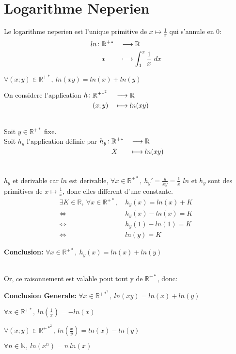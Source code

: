 \documentclass[12pt,twoside,a4paper]{article}
\author{MPSI 2}
\begin{document}
	\maketitle
\section{Logarithme Neperien}
	\begin{defi}
		Le logarithme neperien est l'unique primitive de $x\longmapsto\frac{1}{x}$ qui s'annule en 0:
		$$
			\fonction{ln}{\mathbb{R}^{+*}}{\mathbb{R}}{x}{\int_1^x\frac{1}{x}\ dx}
		$$
	\end{defi}
	\begin{prop}
		$\forall(x;y)\in\mathbb{R}^{+*},\ ln(xy)=ln(x)+ln(y)$
	\end{prop}
	\begin{preuve}
		On considere l'application $\begin{aligned}[t]h\colon&\mathbb{R}^{+*^2}&&\longrightarrow\mathbb{R} \\&(x;y)&&\longmapsto ln(xy)\end{aligned}$\\\\
		\begin{tab}
			Soit $y\in\mathbb{R}^{+*}$ fixe. \\
			Soit $h_y$ l'application définie par $\begin{aligned}[t]h_y\colon&\mathbb{R}^{+*}&&\longrightarrow\mathbb{R} \\&X&&\longmapsto ln(xy)\end{aligned}$\\\\\\
			$h_y$ et derivable car $ln$ est derivable, $\forall x\in\mathbb{R}^{+*},\ h_y'=\frac{y}{xy}=\frac{1}{x}$
			$ln$ et $h_y$ sont des primitives de $x\longmapsto\frac{1}{x}$, donc elles different d'une constante.
			$$\begin{aligned}
				\exists K\in\mathbb{R},\ \forall x\in\mathbb{R}^{+*},\ &h_y(x)=ln(x)+K\\
				\iff &h_y(x)-ln(x)=K\\
				\iff &h_y(1)-ln(1)=K\\
				\iff &ln(y)=K
			\end{aligned}$$
		\end{tab}
		\textbf{Conclusion:} $\forall x\in\mathbb{R}^{+*},\ h_y(x)=ln(x)+ln(y)$\\
		\\
		\begin{tab}Or, ce raisonnement est valable pout tout y de $\mathbb{R}^{+*}$, donc:\\\end{tab}
		\textbf{Conclusion Generale:} $\forall x\in\mathbb{R}^{+*^2},\ ln(xy)=ln(x)+ln(y)$
	\end{preuve}
	\begin{coro}
		\begin{liste}
			\item $\forall x\in\mathbb{R}^{+*},\ ln\left(\frac{1}{x}\right)=-ln(x)$
			\item $\forall(x;y)\in\mathbb{R}^{+*^2},\ ln\left(\frac{x}{y}\right)=ln(x)-ln(y)$
			\item $\forall n\in\mathbb{N},\ ln\left(x^n\right)=n\ ln(x)$
		\end{liste}
	\end{coro}
\end{document}

